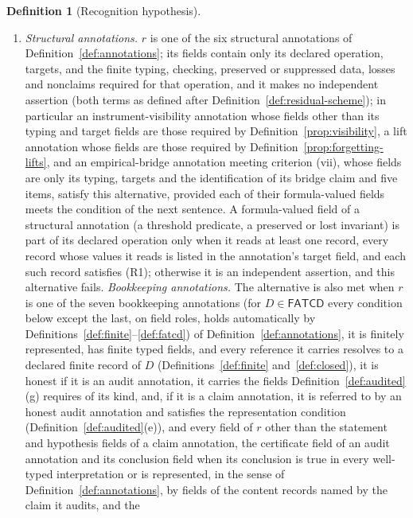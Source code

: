 \documentclass[11pt]{article}
\theoremstyle{definition}
\newtheorem{definition}[theorem]{Definition}
\newcommand{\FATCD}{\ensuremath{\mathsf{FATCD}}}
\begin{document}
\begin{definition}[Recognition hypothesis]
\begin{enumerate}[label=(R\arabic*),topsep=2pt,itemsep=1pt]
    some \(P_i\), and each of its predicate, comparison, invariant, law or claim
    fields is an input to the recorded check of \(W_i\) on that cluster; merely
    referencing a witness cluster does not suffice;
  \item \emph{Structural annotations.} \(r\) is one of the six structural annotations of
    Definition~\ref{def:annotations}; its fields contain only its declared
    operation, targets, and the finite typing, checking, preserved or
    suppressed data, losses and nonclaims required for that operation, and it
    makes no independent assertion (both terms as defined after
    Definition~\ref{def:residual-scheme}); in particular an instrument-visibility
    annotation whose fields other than its typing and target fields are those
    required by Definition~\ref{prop:visibility}, a lift annotation whose fields are those
    required by Definition~\ref{prop:forgetting-lifts}, and an
    empirical-bridge annotation meeting criterion (vii), whose fields are only
    its typing, targets and the identification of its bridge claim and five
    items, satisfy this
    alternative, provided each of their formula-valued fields meets the
    condition of the next sentence. A formula-valued field of a structural annotation (a threshold predicate, a preserved or lost invariant) is part of its declared operation only when it reads at least one record, every record whose values it reads is listed in the annotation's target field, and each such record satisfies (R1); otherwise it is an independent assertion, and this alternative fails.
    \emph{Bookkeeping annotations.} The alternative is also met when \(r\) is one of the seven bookkeeping annotations (for \(D\in\FATCD{}\) every condition below except the last, on field roles, holds automatically by Definitions~\ref{def:finite}--\ref{def:fatcd}) of
    Definition~\ref{def:annotations}, it is finitely represented, has finite typed fields, and every reference it carries resolves to a declared finite record of \(D\) (Definitions~\ref{def:finite} and~\ref{def:closed}), it is honest if it is an audit annotation, it carries the fields Definition~\ref{def:audited}(g) requires of its kind, and, if it is a claim annotation, it is referred to by an honest audit annotation and satisfies the representation condition (Definition~\ref{def:audited}(e)), and every field of
    \(r\) other than the statement and hypothesis fields of a claim annotation,
    the certificate field of an audit annotation and its conclusion field when its conclusion is true in every well-typed interpretation or is represented, in the sense of Definition~\ref{def:annotations}, by fields of the content records named by the claim it audits, and the

\end{enumerate}
\end{definition}
\end{document}
